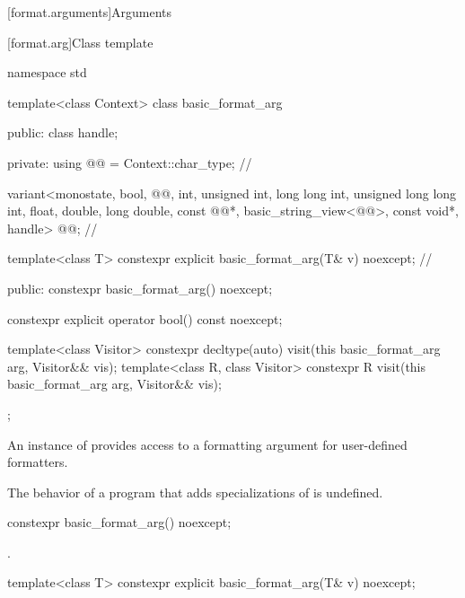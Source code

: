 [format.arguments]{Arguments}

[format.arg]{Class template }

%
\begin{codeblock}
namespace std {
  template<class Context>
  class basic_format_arg {
  public:
    class handle;

  private:
    using @@ = Context::char_type;                                       // \expos

    variant<monostate, bool, @@,
            int, unsigned int, long long int, unsigned long long int,
            float, double, long double,
            const @@*, basic_string_view<@@>,
            const void*, handle> @@;                                        // \expos

    template<class T> constexpr explicit basic_format_arg(T& v) noexcept;       // \expos

  public:
    constexpr basic_format_arg() noexcept;

    constexpr explicit operator bool() const noexcept;

    template<class Visitor>
      constexpr decltype(auto) visit(this basic_format_arg arg, Visitor&& vis);
    template<class R, class Visitor>
      constexpr R visit(this basic_format_arg arg, Visitor&& vis);
  };
}
\end{codeblock}

\pnum
An instance of  provides access to
a formatting argument for user-defined formatters.

\pnum
The behavior of a program that adds specializations of
 is undefined.

%
\begin{itemdecl}
constexpr basic_format_arg() noexcept;
\end{itemdecl}

\begin{itemdescr}
\pnum
\ensures
{}.
\end{itemdescr}

\begin{itemdecl}
template<class T> constexpr explicit basic_format_arg(T& v) noexcept;
\end{itemdecl}

